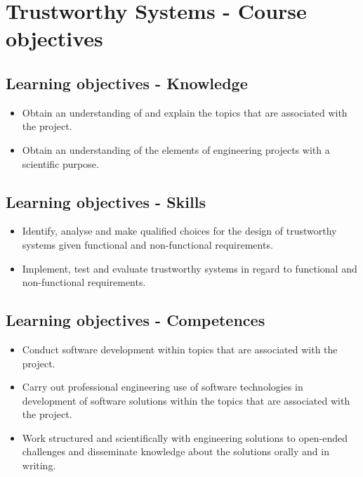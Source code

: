 \section{Trustworthy Systems - Course objectives}\label{appendix:course-objectives}

\subsection{Learning objectives - Knowledge}\label{appendix:knowledge}

\begin{itemize}
    \item Obtain an understanding of and explain the topics that are associated with the project.
    \item Obtain an understanding of the elements of engineering projects with a scientific purpose.
\end{itemize}

\subsection{Learning objectives - Skills}\label{appendix:skills}

\begin{itemize}
    \item Identify, analyse and make qualified choices for the design of trustworthy systems given functional and non-functional requirements.
    \item Implement, test and evaluate trustworthy systems in regard to functional and non-functional requirements.
\end{itemize}

\subsection{Learning objectives - Competences}\label{appendix:competences}

\begin{itemize}
    \item Conduct software development within topics that are associated with the project.
    \item Carry out professional engineering use of software technologies in development of software solutions within the topics that are associated with the project.
    \item Work structured and scientifically with engineering solutions to open-ended challenges and disseminate knowledge about the solutions orally and in writing.
\end{itemize}


